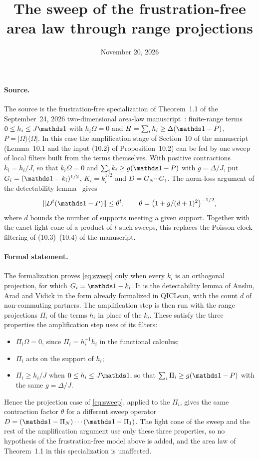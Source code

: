 \documentclass{article}
\title{The sweep of the frustration-free area law through range projections}
\author{}
\date{November 20, 2026}
\begin{document}
\maketitle
{}

\paragraph{Source.}
The source is the frustration-free specialization of Theorem~1.1 of the
September~24, 2026 two-dimensional area-law manuscript~\cite{OpenAI2026AreaLaw}:
finite-range terms $0\le h_i\le J\Id$ with $h_i\Omega=0$ and
$H=\sum_ih_i\ge\Delta(\Id-P)$, $P=\lvert\Omega\rangle\langle\Omega\rvert$.
In this case the amplification stage of Section~10 of the manuscript
(Lemma~10.1 and the input (10.2) of Proposition~10.2) can be fed by one sweep
of local filters built from the terms themselves. With positive contractions
$k_i=h_i/J$, so that $k_i\Omega=0$ and $\sum_ik_i\ge g(\Id-P)$ with
$g=\Delta/J$, put $G_i=(\Id-k_i)^{1/2}$, $K_i=k_i^{1/2}$ and $D=G_N\cdots G_1$. The
norm-loss argument of the detectability lemma~\cite{Anshu2016Simple} gives
\begin{equation}
    \|D^t(\Id-P)\|\le\theta^t,\qquad \theta=\bigl(1+g/(d+1)^2\bigr)^{-1/2},
    \label{eq:sweep}
\end{equation}
where $d$ bounds the number of supports meeting a given support. Together with
the exact light cone of a product of $t$ such sweeps, this replaces the
Poisson-clock filtering of (10.3)--(10.4) of the manuscript.

\paragraph{Formal statement.}
The formalization proves \eqref{eq:sweep} only when every $k_i$ is an
orthogonal projection, for which $G_i=\Id-k_i$. It is the detectability lemma
of Anshu, Arad and Vidick in the form already formalized in QICLean, with the
count $d$ of non-commuting partners. The amplification step is
then run with the range projections $\Pi_i$ of the terms $h_i$ in place of the
$k_i$. These satisfy the three properties the amplification step uses of its filters:
\begin{itemize}
    \item $\Pi_i\Omega=0$, since $\Pi_i=h_i^{-1}h_i$ in the functional calculus;
    \item $\Pi_i$ acts on the support of $h_i$;
    \item $\Pi_i\ge h_i/J$ when $0\le h_i\le J\Id$, so that
          $\sum_i\Pi_i\ge g(\Id-P)$ with the same $g=\Delta/J$.
\end{itemize}
Hence the projection case of \eqref{eq:sweep}, applied to the $\Pi_i$, gives
the same contraction factor $\theta$ for a different sweep operator
$D=(\Id-\Pi_N)\cdots(\Id-\Pi_1)$. The light cone of the sweep and the rest of the amplification argument use
only these three properties, so no hypothesis of the frustration-free model
above is added, and the area law of Theorem~1.1 in this specialization is
unaffected.
\end{document}
